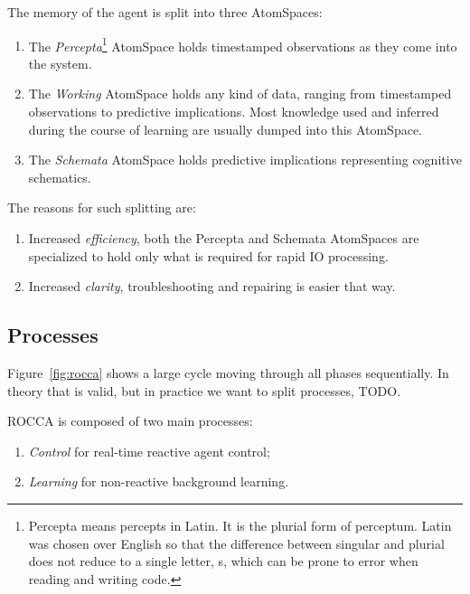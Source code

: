 \documentclass[runningheads]{llncs}
\begin{document}
The memory of the agent is split into three AtomSpaces:
\begin{enumerate}
\item The \emph{Percepta}\footnote{Percepta means percepts in Latin.
    It is the plurial form of perceptum.  Latin was chosen over
    English so that the difference between singular and plurial does
    not reduce to a single letter, s, which can be prone to error when
    reading and writing code.}  AtomSpace holds timestamped
  observations as they come into the system.
\item The \emph{Working} AtomSpace holds any kind of data, ranging
  from timestamped observations to predictive implications.  Most
  knowledge used and inferred during the course of learning are
  usually dumped into this AtomSpace.
\item The \emph{Schemata} AtomSpace holds predictive implications
  representing cognitive schematics.
\end{enumerate}
The reasons for such splitting are:
\begin{enumerate}
\item Increased \emph{efficiency}, both the Percepta and Schemata
  AtomSpaces are specialized to hold only what is required for rapid
  IO processing.
\item Increased \emph{clarity}, troubleshooting and repairing is
  easier that way.
\end{enumerate}

\subsection{Processes}

Figure~\ref{fig:rocca} shows a large cycle moving through all phases
sequentially.  In theory that is valid, but in practice we want to
split processes, TODO.

ROCCA is composed of two main processes:
\begin{enumerate}
\item \emph{Control} for real-time reactive agent control;
\item \emph{Learning} for non-reactive background learning.
\end{enumerate}
\end{document}
